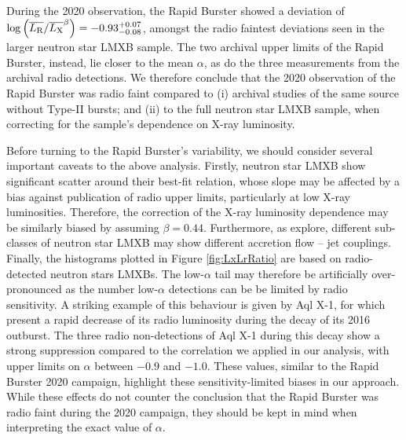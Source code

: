 \documentclass[fleqn,usenatbib]{mnras}
\begin{document}
During the 2020 observation, the Rapid Burster showed a deviation of $\log \left(\overline{L_{\rm R}} / \overline{L_{\rm X}}^{\beta}\right) = -0.93^{+0.07}_{-0.08}$, amongst the radio faintest deviations seen in the larger neutron star LMXB sample. The two archival upper limits of the Rapid Burster, instead, lie closer to the mean $\alpha$, as do the three measurements from the archival radio detections. We therefore conclude that the 2020 observation of the Rapid Burster was radio faint compared to (i) archival studies of the same source without Type-II bursts; and (ii) to the full neutron star LMXB sample, when correcting for the sample's dependence on X-ray luminosity.

Before turning to the Rapid Burster's variability, we should consider several important caveats to the above analysis. Firstly, neutron star LMXB show significant scatter around their best-fit relation, whose slope may be affected by a bias against publication of radio upper limits, particularly at low X-ray luminosities. Therefore, the correction of the X-ray luminosity dependence may be similarly biased by assuming $\beta = 0.44$. Furthermore, as \citet{gallo18} explore, different sub-classes of neutron star LMXB may show different accretion flow -- jet couplings. Finally, the histograms plotted in Figure \ref{fig:LxLrRatio} are based on radio-detected neutron stars LMXBs. The low-$\alpha$ tail may therefore be artificially over-pronounced as the number low-$\alpha$ detections can be be limited by radio sensitivity. A striking example of this behaviour is given by Aql X-1, for which \citep{gusinskaia2020} present a rapid decrease of its radio luminosity during the decay of its 2016 outburst. The three radio non-detections of Aql X-1 during this decay show a strong suppression compared to the correlation we applied in our analysis, with upper limits on $\alpha$ between $-0.9$ and $-1.0$. These values, similar to the Rapid Burster 2020 campaign, highlight these sensitivity-limited biases in our approach. While these effects do not counter the conclusion that the Rapid Burster was radio faint during the 2020 campaign, they should be kept in mind when interpreting the exact value of $\alpha$. 
\end{document}
